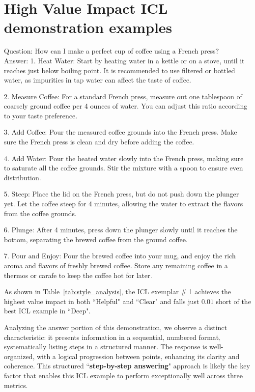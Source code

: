 \section{High Value Impact ICL demonstration examples}
\label{appendix:high_icl}

% 

\begin{tcolorbox}[fonttitle = \small\bfseries, title=ICL exemplar \# 1 with highest ``Helpful'' and ``clear'',colframe=gray!2!black,colback=gray!2!white,boxrule=1pt,boxsep=0pt,left=5pt,right=5pt,fontupper=\footnotesize, halign title = flush center]
Question: How can I make a perfect cup of coffee using a French press?\\
Answer: 1. Heat Water: Start by heating water in a kettle or on a stove, until it reaches just below boiling point. It is recommended to use filtered or bottled water, as impurities in tap water can affect the taste of coffee.

2. Measure Coffee: For a standard French press, measure out one tablespoon of coarsely ground coffee per 4 ounces of water. You can adjust this ratio according to your taste preference.

3. Add Coffee: Pour the measured coffee grounds into the French press. Make sure the French press is clean and dry before adding the coffee.

4. Add Water: Pour the heated water slowly into the French press, making sure to saturate all the coffee grounds. Stir the mixture with a spoon to ensure even distribution.

5. Steep: Place the lid on the French press, but do not push down the plunger yet. Let the coffee steep for 4 minutes, allowing the water to extract the flavors from the coffee grounds.

6. Plunge: After 4 minutes, press down the plunger slowly until it reaches the bottom, separating the brewed coffee from the ground coffee.

7. Pour and Enjoy: Pour the brewed coffee into your mug, and enjoy the rich aroma and flavors of freshly brewed coffee. Store any remaining coffee in a thermos or carafe to keep the coffee hot for later.
\end{tcolorbox}

As shown in Table~\ref{tab:style_analysis}, the ICL exemplar \# 1 achieves the highest value impact in both ``Helpful" and ``Clear" and falls just $0.01$ short of the best ICL example in ``Deep".

Analyzing the answer portion of this demonstration, we observe a distinct characteristic: it presents information in a sequential, numbered format, systematically listing steps in a structured manner. The response is well-organized, with a logical progression between points, enhancing its clarity and coherence. This structured ``\textbf{step-by-step answering}" approach is likely the key factor that enables this ICL example to perform exceptionally well across three metrics.

